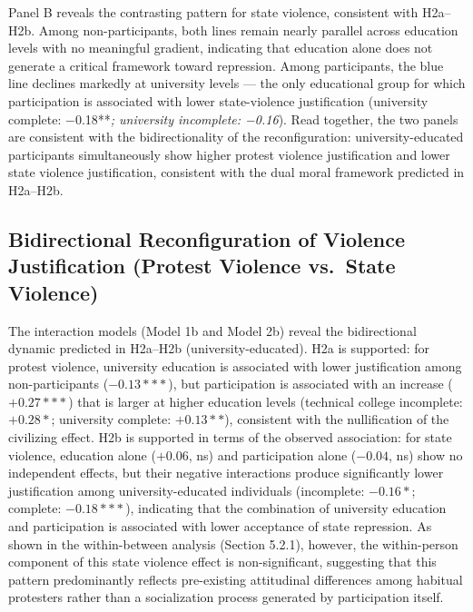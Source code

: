 \documentclass[
  13pt,
]{article}
\begin{document}
Panel B reveals the contrasting pattern for state violence, consistent
with H2a--H2b. Among non-participants, both lines remain nearly parallel
across education levels with no meaningful gradient, indicating that
education alone does not generate a critical framework toward
repression. Among participants, the blue line declines markedly at
university levels --- the only educational group for which participation
is associated with lower state-violence justification (university
complete: −0.18**\emph{; university incomplete: −0.16}). Read together,
the two panels are consistent with the bidirectionality of the
reconfiguration: university-educated participants simultaneously show
higher protest violence justification and lower state violence
justification, consistent with the dual moral framework predicted in
H2a--H2b.

\subsection{Bidirectional Reconfiguration of Violence Justification
(Protest Violence vs.~State
Violence)}\label{bidirectional-reconfiguration-of-violence-justification-protest-violence-vs.-state-violence}

The interaction models (Model 1b and Model 2b) reveal the bidirectional
dynamic predicted in H2a--H2b (university-educated). H2a is supported:
for protest violence, university education is associated with lower
justification among non-participants (\(-0.13***\)), but participation
is associated with an increase (\(+0.27***\)) that is larger at higher
education levels (technical college incomplete: \(+0.28*\); university
complete: \(+0.13**\)), consistent with the nullification of the
civilizing effect. H2b is supported in terms of the observed
association: for state violence, education alone (\(+0.06\), ns) and
participation alone (\(-0.04\), ns) show no independent effects, but
their negative interactions produce significantly lower justification
among university-educated individuals (incomplete: \(-0.16*\); complete:
\(-0.18***\)), indicating that the combination of university education
and participation is associated with lower acceptance of state
repression. As shown in the within-between analysis (Section 5.2.1),
however, the within-person component of this state violence effect is
non-significant, suggesting that this pattern predominantly reflects
pre-existing attitudinal differences among habitual protesters rather
than a socialization process generated by participation itself.
\end{document}
